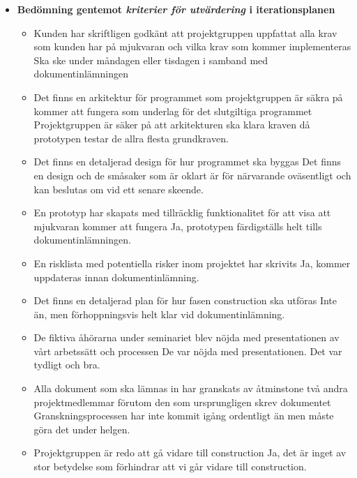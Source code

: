 \begin{itemize}
	\item \textbf{Bedömning gentemot \textit{kriterier för utvärdering} i iterationsplanen}
		\begin{itemize}
		\item Kunden har skriftligen godkänt att projektgruppen uppfattat alla krav som kunden har på mjukvaran och vilka krav som kommer implementeras
		Ska ske under måndagen eller tisdagen i samband med dokumentinlämningen
		\item Det finns en arkitektur för programmet som projektgruppen är säkra på kommer att fungera som underlag för det slutgiltiga programmet
		Projektgruppen är säker på att arkitekturen ska klara kraven då prototypen testar de allra flesta grundkraven.
		\item Det finns en detaljerad design för hur programmet ska byggas
		Det finns en design och de småsaker som är oklart är för närvarande oväsentligt och kan beslutas om vid ett senare skeende.
		\item En prototyp har skapats med tillräcklig funktionalitet för att visa att mjukvaran kommer att fungera
		Ja, prototypen färdigställs helt tills dokumentinlämningen.
		\item En risklista med potentiella risker inom projektet har skrivits
		Ja, kommer uppdateras innan dokumentinlämning.
		\item Det finns en detaljerad plan för hur fasen construction ska utföras
		Inte än, men förhoppningsvis helt klar vid dokumentinlämning.
		\item De fiktiva åhörarna under seminariet blev nöjda med presentationen av vårt arbetssätt och processen
		De var nöjda med presentationen. Det var tydligt och bra.
		\item Alla dokument som ska lämnas in har granskats av åtminstone två andra projektmedlemmar förutom den som ursprungligen skrev dokumentet
		Granskningsprocessen har inte kommit igång ordentligt än men måste göra det under helgen.
		\item Projektgruppen är redo att gå vidare till construction
		Ja, det är inget av stor betydelse som förhindrar att vi går vidare till construction.
		\end{itemize}
\end{itemize}



